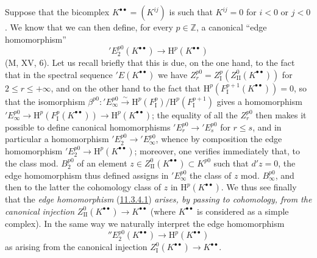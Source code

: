 \begin{env}[11.3.4]
\label{0.11.3.4}
Suppose that the bicomplex $K^{\bullet\bullet}=(K^{ij})$ is such that
$K^{ij}=0$ for $i<0$ or $j<0$. We know that we can then define, for every
$p\in\mathbb Z$, a canonical ``edge homomorphism''
\[
\label{0.11.3.4.1}
  'E_2^{p0}(K^{\bullet\bullet})\longrightarrow
  \mathrm H^p(K^{\bullet\bullet})
  \tag{11.3.4.1}
\]
(M, XV, 6). Let us recall briefly that this is due, on the one hand, to the fact
that in the spectral sequence $'E(K^{\bullet\bullet})$ we have
$Z_r^{p0}=Z_{\mathrm I}^p(Z_{\mathrm{II}}^0(K^{\bullet\bullet}))$ for
$2\leq r\leq+\infty$, and on the other hand to the fact that
$\mathrm H^p(F_{\mathrm I}^{p+1}(K^{\bullet\bullet}))=0$, so that
the isomorphism
$\beta^{p0}:'E_\infty^{p0}\xrightarrow{\sim}
\mathrm H^p(F_{\mathrm I}^p)/\mathrm H^p(F_{\mathrm I}^{p+1})$ gives a
homomorphism
$'E_\infty^{p0}\to\mathrm H^p(F_{\mathrm I}^p(K^{\bullet\bullet}))
\to\mathrm H^p(K^{\bullet\bullet})$; the equality of all the $Z_r^{p0}$ then
makes it possible to define canonical homomorphisms
$'E_r^{p0}\to'E_s^{p0}$ for $r\leq s$, and in particular a homomorphism
$'E_2^{p0}\to'E_\infty^{p0}$, whence by composition the edge homomorphism
$'E_2^{p0}\to\mathrm H^p(K^{\bullet\bullet})$; moreover, one verifies immediately
that, to the class mod. $B_2^{p0}$ of an element
$z\in Z_{\mathrm{II}}^0(K^{\bullet\bullet})\subset K^{p0}$ such that $d'z=0$,
the edge homomorphism thus defined assigns in $'E_\infty^{p0}$ the
class of $z$ mod. $B_\infty^{p0}$, and then to the latter the cohomology
class of $z$ in $\mathrm H^p(K^{\bullet\bullet})$. We thus see
finally that the \emph{edge homomorphism}
(\hyperref[0.11.3.4.1]{11.3.4.1}) \emph{arises, by passing to cohomology,
from the canonical injection}
$Z_{\mathrm{II}}^0(K^{\bullet\bullet})\to K^{\bullet\bullet}$ (where
$K^{\bullet\bullet}$ is considered as a simple complex). In the same way we
naturally interpret the edge homomorphism
\[
\label{0.11.3.4.2}
  ''E_2^{p0}(K^{\bullet\bullet})\longrightarrow
  \mathrm H^p(K^{\bullet\bullet})
  \tag{11.3.4.2}
\]
as arising from the canonical injection
$Z_{\mathrm I}^0(K^{\bullet\bullet})\to K^{\bullet\bullet}$.
\end{env}

